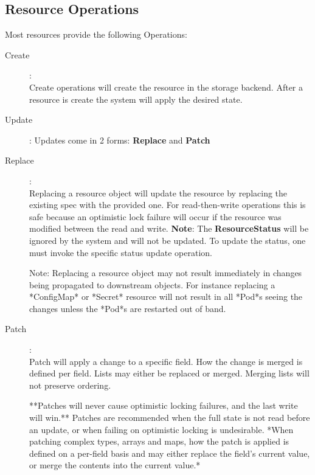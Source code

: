 \subsection{Resource Operations}

Most resources provide the following Operations:

\begin{description}
	\item [Create]{:}\\
Create operations will create the resource in the storage backend.  After a resource is create the system will apply
the desired state.

	\item [Update] :
Updates come in 2 forms: \textbf{Replace} and \textbf{Patch}

	\item [Replace]{:}\\
Replacing a resource object will update the resource by replacing the existing spec with the provided one.  For
read-then-write operations this is safe because an optimistic lock failure will occur if the resource was modified
between the read and write.  \textbf{Note}: The \textbf{ResourceStatus} will be ignored by the system and will not be updated.
To update the status, one must invoke the specific status update operation.

Note: Replacing a resource object may not result immediately in changes being propagated to downstream objects.  For instance
replacing a *ConfigMap* or *Secret* resource will not result in all *Pod*s seeing the changes unless the *Pod*s are
restarted out of band.

	\item [Patch]{:}\\
Patch will apply a change to a specific field.  How the change is merged is defined per field.  Lists may either be
replaced or merged.  Merging lists will not preserve ordering.

**Patches will never cause optimistic locking failures, and the last write will win.**  Patches are recommended
when the full state is not read before an update, or when failing on optimistic locking is undesirable.  *When patching
complex types, arrays and maps, how the patch is applied is defined on a per-field basis and may either replace
the field's current value, or merge the contents into the current value.*


\end{description}
